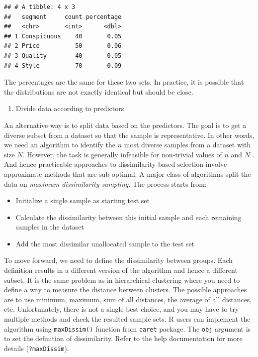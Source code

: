 \documentclass[
  12pt,
]{krantz}
\providecommand{\tightlist}{%
  \setlength{\itemsep}{0pt}\setlength{\parskip}{0pt}}
\begin{document}
\begin{verbatim}
## # A tibble: 4 x 3
##   segment     count percentage
##   <chr>       <int>      <dbl>
## 1 Conspicuous    40       0.05
## 2 Price          50       0.06
## 3 Quality        40       0.05
## 4 Style          70       0.09
\end{verbatim}

The percentages are the same for these two sets. In practice, it is possible that the distributions are not exactly identical but should be close.

\begin{enumerate}
\def\labelenumi{(\arabic{enumi})}
\setcounter{enumi}{1}
\tightlist
\item
  Divide data according to predictors
\end{enumerate}

An alternative way is to split data based on the predictors. The goal is to get a diverse subset from a dataset so that the sample is representative. In other words, we need an algorithm to identify the \(n\) most diverse samples from a dataset with size \(N\). However, the task is generally infeasible for non-trivial values of \(n\) and \(N\) \citep{willett}. And hence practicable approaches to dissimilarity-based selection involve approximate methods that are sub-optimal. A major class of algorithms split the data on \emph{maximum dissimilarity sampling}. The process starts from:

\begin{itemize}
\tightlist
\item
  Initialize a single sample as starting test set
\item
  Calculate the dissimilarity between this initial sample and each remaining samples in the dataset
\item
  Add the most dissimilar unallocated sample to the test set
\end{itemize}

To move forward, we need to define the dissimilarity between groups. Each definition results in a different version of the algorithm and hence a different subset. It is the same problem as in hierarchical clustering where you need to define a way to measure the distance between clusters. The possible approaches are to use minimum, maximum, sum of all distances, the average of all distances, etc. Unfortunately, there is not a single best choice, and you may have to try multiple methods and check the resulted sample sets. R users can implement the algorithm using \texttt{maxDissim()} function from \texttt{caret} package. The \texttt{obj} argument is to set the definition of dissimilarity. Refer to the help documentation for more details (\texttt{?maxDissim}).
\end{document}
